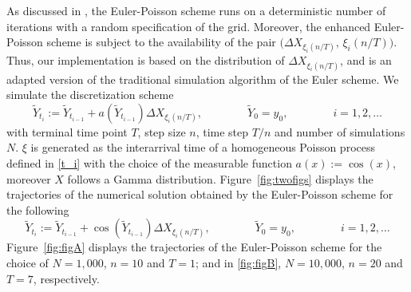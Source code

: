 As discussed in , the Euler-Poisson scheme runs on a deterministic number of iterations with a random specification of the grid. Moreover, the enhanced Euler-Poisson scheme is subject to the availability of the pair  $\big(\Delta X_{\xi_{i}(n/T)}, \, \xi_{i}(n/T)\big)$. Thus, our implementation is based on the distribution of $\Delta X_{\xi_{i}(n/T)}$, and is an adapted version of the traditional simulation algorithm of the Euler scheme. We simulate the discretization scheme
\begin{equation*}
\tilde{Y}_{t_{i}} := \tilde{Y}_{t_{i-1}} + a(\tilde{Y}_{t_{i-1}})\Delta X_{\xi_{i}(n/T)},  \qquad \qquad
  \tilde{Y}_0 = y_0, \qquad \qquad  i = 1, 2, \ldots 
\end{equation*}
with terminal time point $T$, step size $n$, time step $T/n$ and number of simulations $N$. \break $\xi$ is generated as the interarrival time of a homogeneous Poisson process defined in \eqref{t_i} with the choice of the measurable function $a(x):= \cos(x)$, moreover $X$ follows a Gamma distribution. Figure~\ref{fig:twofigs} displays the trajectories of the numerical solution obtained by the  Euler-Poisson scheme for the following 
\begin{equation*}
\tilde{Y}_{t_{i}} := \tilde{Y}_{t_{i-1}} + \cos(\tilde{Y}_{t_{i-1}})\Delta X_{\xi_{i}(n/T)},  \qquad \qquad
  \tilde{Y}_0 = y_0, \qquad \qquad  i = 1, 2, \ldots 
\end{equation*}
Figure~\ref{fig:figA} displays the trajectories of the Euler-Poisson scheme for the choice of $N =1,000$, $n=10$ and $T=1$; and in \ref{fig:figB}, $N =10,000$, $n=20$ and $T=7$, respectively.
